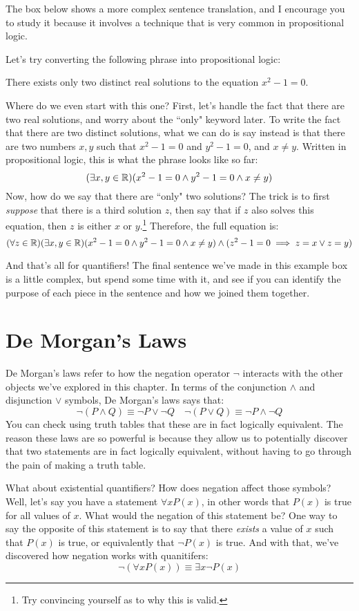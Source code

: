 The box below shows a more complex sentence translation, and I encourage you to study it because it involves 
a technique that is very common in propositional logic. 
\begin{example}{}{}
	Let's try converting the following phrase into propositional logic:
	\begin{center}
		There exists only two distinct real solutions to the equation \( x^2 - 1 = 0 \).
	\end{center}
	Where do we even start with this one? First, let's handle the fact that there are two real solutions, and 
	worry about the ``only" keyword later. To write the fact that there are two distinct solutions, what we can do 
	is say instead is that there are two numbers \( x,y \) such that \( x^2 - 1 = 0 \) and \( y^2 - 1 = 0 \), 
	and \( x \neq y \). Written in propositional logic, this is what the phrase looks like so far:
	\[
		(\exists x,y \in \mathbb R) (x^2 - 1 = 0 \land y^2 - 1 = 0 \land x \neq y)
	\] 
	Now, how do we say that there are ``only" two solutions? The trick is to first \textit{suppose} that there 
	is a third solution \( z \), then say that if \( z \) also solves this equation, then \( z \) is either
	\( x \) or \( y \).\footnote{Try convincing yourself as to why this is valid.} Therefore, the full 
	equation is:
	\[
		(\forall z \in \mathbb R)(\exists x, y \in \mathbb R)(x^2 - 1 = 0 \land y^2 - 1 = 0 \land x \neq y) \land 
		(z^2 - 1 = 0 \implies z = x \lor z = y)
	\] 
\end{example}
And that's all for quantifiers! The final sentence we've made in this example box is a little complex, but spend 
some time with it, and see if you can identify the purpose of each piece in the sentence and how we joined 
them together. 

\section{De Morgan's Laws}
De Morgan's laws refer to how the negation operator \( \neg \) interacts with the other objects we've explored 
in this chapter. In terms of the conjunction \( \land \) and disjunction \( \lor \) symbols, De Morgan's laws 
says that:
\[
\neg(P \land Q) \equiv \neg P \lor \neg Q \quad \neg(P \lor Q) \equiv \neg P \land \neg Q
\] 
You can check using truth tables that these are in fact logically equivalent. The reason these laws are so powerful 
is because they allow us to potentially discover that two statements are in fact logically equivalent, without having 
to go through the pain of making a truth table.  

What about existential quantifiers? How does negation affect those symbols? Well, let's say you have a statement 
\( \forall x P(x) \), in other words that \( P(x) \) is true for all values of \( x \). 
What would the negation of this statement be? One way to say the opposite of this statement is to say that 
there \textit{exists} a value of \( x \) such that \( P(x) \) is true, or equivalently that \( \neg P(x) \) is true. 
And with that, we've discovered how negation works with quanitifers:
\[
\neg(\forall x P(x)) \equiv \exists x \neg P(x)
\] 
 


